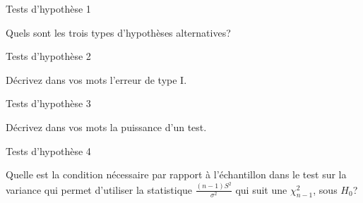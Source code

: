 \documentclass{BeamerTemplate}
\begin{document}
\begin{frame}{Tests d'hypothèse 1}\label{tests1}
\begin{center}

Quels sont les trois types d'hypothèses alternatives?

\end{center}

\end{frame}

\begin{frame}{Tests d'hypothèse 2}\label{tests2}
\begin{center}

Décrivez dans vos mots l'erreur de type I.

\end{center}

\end{frame}

\begin{frame}{Tests d'hypothèse 3}\label{tests3}
\begin{center}

Décrivez dans vos mots la puissance d'un test.

\end{center}

\end{frame}


\begin{frame}{Tests d'hypothèse 4}\label{tests4}
\begin{center}

Quelle est la condition nécessaire par rapport à l'échantillon dans le test sur la variance qui permet d'utiliser la statistique $\displaystyle \frac{(n-1)S^2}{\sigma^2}$ qui suit une $\chi_{n-1}^2$, sous $H_0$?

\end{center}

\end{frame}
\end{document}
